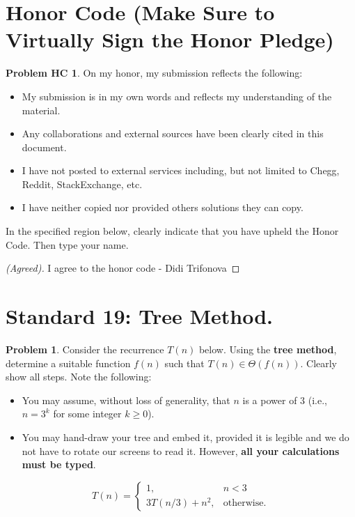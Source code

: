 \documentclass[11pt]{article}
\theoremstyle{definition}
\theoremstyle{definition}
\newtheorem{required}{Problem}
\newtheorem*{requiredHC}{Problem HC}
\theoremstyle{definition}
\begin{document}
\section*{Honor Code (Make Sure to Virtually Sign the Honor Pledge)} 
\hypertarget{HonorCode}{}

\begin{requiredHC}
On my honor, my submission reflects the following:
\begin{itemize}
\item My submission is in my own words and reflects my understanding of the material.
\item Any collaborations and external sources have been clearly cited in this document.
\item I have not posted to external services including, but not limited to Chegg, Reddit, StackExchange, etc.
\item I have neither copied nor provided others solutions they can copy.
\end{itemize}

\noindent In the specified region below, clearly indicate that you have upheld the Honor Code. Then type your name. 
\end{requiredHC}

\begin{proof}[(Agreed)]
I agree to the honor code - Didi Trifonova
\end{proof}



\newpage
\section{Standard 19: Tree Method.}

\begin{required}
Consider the recurrence $T(n)$ below. Using the {\bf tree method}, determine a suitable function $f(n)$ such that $T(n) \in \Theta(f(n))$. Clearly show all steps. Note the following:
\begin{itemize}
\item You may assume, without loss of generality, that $n$ is a power of $3$ (i.e., $n = 3^{k}$ for some integer $k \geq 0$).
\item You may hand-draw your tree and embed it, provided it is legible and we do not have to rotate our screens to read it. However, \textbf{all your calculations must be typed}.
\end{itemize}

\[
T(n) = \begin{cases} 1, &  n < 3 \\ 
3T(n/3) + n^{2}, &  \text{otherwise.} \end{cases}
\]

\end{required}
\end{document}
